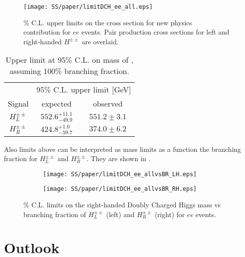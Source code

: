 \begin{figure}[h]
\begin{center}
\texttt{[image: SS/paper/limitDCH\_ee\_all.eps]}
\caption{\% C.L. upper limits on the cross section for new physics contribution for $ee$ events.  
Pair production cross sections for left and right-handed $H^{\pm\pm}$ are overlaid.}
\label{fig:dch_limits_mass}
\end{center}
\end{figure}

\begin{table}[htbp]
\caption{Upper limit at 95\% C.L. on mass of \dch, assuming 100\% branching fraction.}
\begin{center}
\begin{tabular}{c||c|c}
& \multicolumn{2}{c}{95\%  C.L. upper limit [GeV]}\\
Signal & expected & observed \\
\hline
$H^{\pm\pm}_L$ & $552.6^{+11.1}_{-49.9}$ & $551.2 \pm 3.1$ \\
\hline
$H^{\pm\pm}_R$ & $424.8^{+1.0}_{-59.7}$ & $374.0 \pm 6.2$ \\
\end{tabular}
\end{center}
\label{tab:limits_mass}
\end{table}

Also limits above can be interpreted as mass limits as a function the branching fraction for $H^{\pm\pm}_L$ and $H^{\pm\pm}_R$.
They are shown in .

\begin{figure}
\begin{subfigure}{.5\textwidth}
  \centering
  \texttt{[image: SS/paper/limitDCH\_ee\_allvsBR\_LH.eps]}
\end{subfigure}%
\begin{subfigure}{.5\textwidth}
  \centering
  \texttt{[image: SS/paper/limitDCH\_ee\_allvsBR\_RH.eps]}
\end{subfigure}
\caption{\% C.L. limits on the right-handed Doubly Charged Higgs mass vs 
branching fraction of $H^{\pm\pm}_L$ (left) and $H^{\pm\pm}_R$ (right) for $ee$ events.}
  \label{fig:dch_limits_BR}
\end{figure}

\section{Outlook}
\label{sec:ssOutlook}

